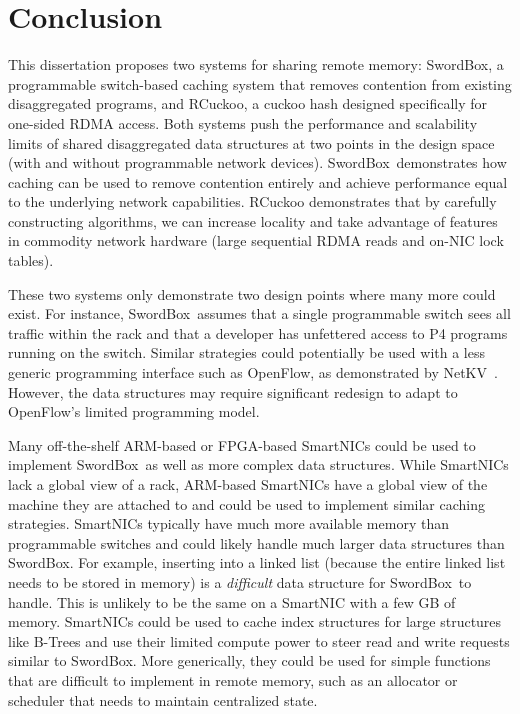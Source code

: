\documentclass[12pt]{ucsddissertation}
\newcommand{\sword}{SwordBox}
\begin{document}
\chapter{Conclusion}

This dissertation proposes two systems for sharing remote memory: \sword, a programmable
switch-based caching system that removes contention from existing disaggregated programs, and
RCuckoo, a cuckoo hash designed specifically for one-sided RDMA access. Both systems push the
performance and scalability limits of shared disaggregated data structures at two points in the
design space (with and without programmable network devices). \sword\ demonstrates how caching can
be used to remove contention entirely and achieve performance equal to the underlying network
capabilities. RCuckoo demonstrates that by carefully constructing algorithms, we can increase
locality and take advantage of features in commodity network hardware (large sequential RDMA reads
and on-NIC lock tables).

These two systems only demonstrate two design points where many more could exist. For instance,
\sword\ assumes that a single programmable switch sees all traffic within the rack and that a
developer has unfettered access to P4 programs running on the switch. Similar strategies could
potentially be used with a less generic programming interface such as OpenFlow, as demonstrated by
NetKV~\cite{netkv}. However, the data structures may require significant redesign to adapt to
OpenFlow's limited programming model.

Many off-the-shelf ARM-based or FPGA-based SmartNICs could be used to implement \sword\ as well as
more complex data structures. While SmartNICs lack a global view of a rack, ARM-based SmartNICs have
a global view of the machine they are attached to and could be used to implement similar caching
strategies. SmartNICs typically have much more available memory than programmable switches and could
likely handle much larger data structures than \sword. For example, inserting into a linked list
(because the entire linked list needs to be stored in memory) is a \textit{difficult} data structure
for \sword\ to handle. This is unlikely to be the same on a SmartNIC with a few GB of memory.
SmartNICs could be used to cache index structures for large structures like B-Trees and use their
limited compute power to steer read and write requests similar to \sword. More generically, they
could be used for simple functions that are difficult to implement in remote memory, such as an
allocator or scheduler that needs to maintain centralized state.
\end{document}
